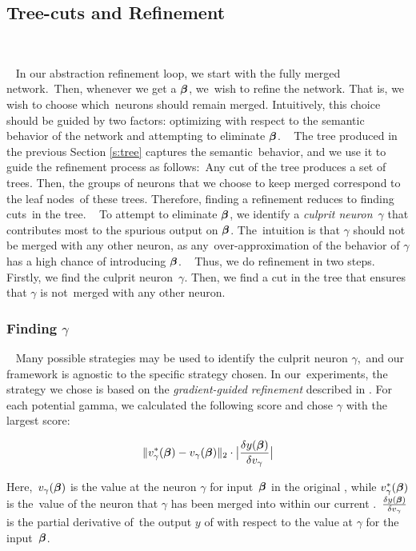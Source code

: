 \subsection{Tree-cuts and Refinement}
\label{s:refinement}
 

 
In our abstraction refinement loop, we start with the fully merged network. Then, whenever we get a \gencex $\boldsymbol{\beta}$, we wish to refine the network. That is, we wish to choose which neurons should remain merged. Intuitively, this choice should be guided by two factors: optimizing with respect to the semantic behavior of the network and attempting to eliminate $\boldsymbol{\beta}$.
 
The tree produced in the previous Section \ref{s:tree} captures the semantic behavior, and we use it to guide the refinement process as follows: Any cut of the tree produces a set of trees. Then, the groups of neurons that we choose to keep merged correspond to the leaf nodes of these trees. Therefore, finding a refinement reduces to finding cuts in the tree.
 
To attempt to eliminate $\boldsymbol{\beta}$, we identify a \textit{culprit neuron} $\gamma$ that contributes most to the spurious output on $\boldsymbol{\beta}$. The intuition is that $\gamma$ should not be merged with any other neuron, as any over-approximation of the behavior of $\gamma$ has a high chance of
introducing $\boldsymbol{\beta}$.
 
Thus, we do refinement in two steps. Firstly, we find the culprit neuron $\gamma$. Then, we find a cut in the tree that ensures that $\gamma$ is not merged with any other neuron.
 
\subsubsection{Finding $\gamma$}
\label{s:finding-gamma}
 
Many possible strategies may be used to identify the culprit neuron $\gamma$, and our framework is agnostic to the specific strategy chosen. In our experiments, the strategy we chose is based on the
\emph{gradient-guided refinement} described in \cite{lin-comb-abs-jan}. For each potential gamma, we calculated the following score and chose $\gamma$ with the largest score:

\begin{equation*}
\begin{aligned}
    \|v^{*}_{\gamma}(\boldsymbol{\beta}) - v_{\gamma}(\boldsymbol{\beta})\|_{2} \cdot 
    \big| \frac{\delta y(\boldsymbol{\beta})}{\delta v_{\gamma}} \big|
\end{aligned}
\end{equation*}


Here, $v_{\gamma}(\boldsymbol{\beta})$ is the value at the neuron $\gamma$ for input $\boldsymbol{\beta}$ in the original \cnc, while $v^{*}_{\gamma}(\boldsymbol{\beta})$ is the value of the neuron that $\gamma$ has been merged into within our current \abs. $\frac{\delta y(\boldsymbol{\beta})}{\delta v_{\gamma}}$ is the partial derivative of the output $y$ of \cnc with respect to the value at $\gamma$ for the input $\boldsymbol{\beta}$.

